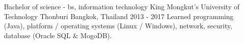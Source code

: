 
\begin{cventries}

  \cventry
    {Bachelor of science - bs, information technology} %
    {King Mongkut's University of Technology Thonburi} %
    {Bangkok, Thailand} %
    {2013 - 2017} %
    {
      {Learned programming (Java), platform / operating systems (Linux / Windows), network, security, database (Oracle SQL \& MogoDB).}
    }

\end{cventries}
